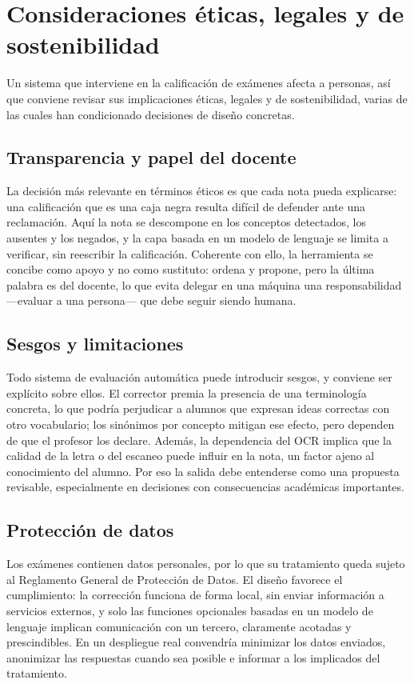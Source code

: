 \chapter{Consideraciones éticas, legales y de sostenibilidad}
\label{cap:consideraciones}

Un sistema que interviene en la calificación de exámenes afecta a personas, así que conviene revisar sus implicaciones éticas, legales y de sostenibilidad, varias de las cuales han condicionado decisiones de diseño concretas.

\section{Transparencia y papel del docente}

La decisión más relevante en términos éticos es que cada nota pueda explicarse: una calificación que es una caja negra resulta difícil de defender ante una reclamación. Aquí la nota se descompone en los conceptos detectados, los ausentes y los negados, y la capa basada en un modelo de lenguaje se limita a verificar, sin reescribir la calificación. Coherente con ello, la herramienta se concibe como apoyo y no como sustituto: ordena y propone, pero la última palabra es del docente, lo que evita delegar en una máquina una responsabilidad —evaluar a una persona— que debe seguir siendo humana.

\section{Sesgos y limitaciones}

Todo sistema de evaluación automática puede introducir sesgos, y conviene ser explícito sobre ellos. El corrector premia la presencia de una terminología concreta, lo que podría perjudicar a alumnos que expresan ideas correctas con otro vocabulario; los sinónimos por concepto mitigan ese efecto, pero dependen de que el profesor los declare. Además, la dependencia del OCR implica que la calidad de la letra o del escaneo puede influir en la nota, un factor ajeno al conocimiento del alumno. Por eso la salida debe entenderse como una propuesta revisable, especialmente en decisiones con consecuencias académicas importantes.

\section{Protección de datos}

Los exámenes contienen datos personales, por lo que su tratamiento queda sujeto al Reglamento General de Protección de Datos. El diseño favorece el cumplimiento: la corrección funciona de forma local, sin enviar información a servicios externos, y solo las funciones opcionales basadas en un modelo de lenguaje implican comunicación con un tercero, claramente acotadas y prescindibles. En un despliegue real convendría minimizar los datos enviados, anonimizar las respuestas cuando sea posible e informar a los implicados del tratamiento.

